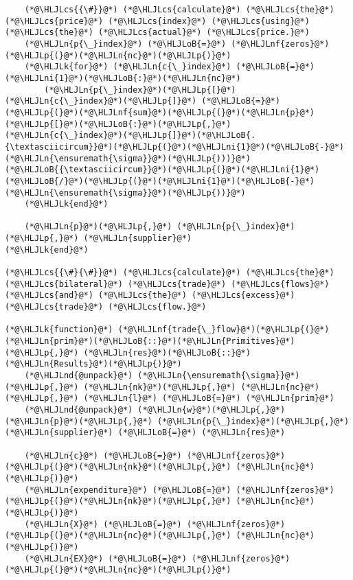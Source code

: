 \documentclass[12pt,a4paper]{article}
\newcommand{\HLJLk}[1]{\textcolor[RGB]{148,91,176}{\textbf{#1}}}
\newcommand{\HLJLn}[1]{#1}
\newcommand{\HLJLnd}[1]{\textcolor[RGB]{214,102,97}{#1}}
\newcommand{\HLJLnf}[1]{\textcolor[RGB]{66,102,213}{#1}}
\newcommand{\HLJLni}[1]{\textcolor[RGB]{59,151,46}{#1}}
\newcommand{\HLJLoB}[1]{\textcolor[RGB]{102,102,102}{\textbf{#1}}}
\newcommand{\HLJLp}[1]{#1}
\newcommand{\HLJLcs}[1]{\textcolor[RGB]{153,153,119}{\textit{#1}}}
\begin{document}
\begin{lstlisting}
    (*@\HLJLcs{{\#}}@*) (*@\HLJLcs{calculate}@*) (*@\HLJLcs{the}@*) (*@\HLJLcs{price}@*) (*@\HLJLcs{index}@*) (*@\HLJLcs{using}@*) (*@\HLJLcs{the}@*) (*@\HLJLcs{actual}@*) (*@\HLJLcs{price.}@*)
    (*@\HLJLn{p{\_}index}@*) (*@\HLJLoB{=}@*) (*@\HLJLnf{zeros}@*)(*@\HLJLp{(}@*)(*@\HLJLn{nc}@*)(*@\HLJLp{)}@*)
    (*@\HLJLk{for}@*) (*@\HLJLn{c{\_}index}@*) (*@\HLJLoB{=}@*) (*@\HLJLni{1}@*)(*@\HLJLoB{:}@*)(*@\HLJLn{nc}@*)
        (*@\HLJLn{p{\_}index}@*)(*@\HLJLp{[}@*)(*@\HLJLn{c{\_}index}@*)(*@\HLJLp{]}@*) (*@\HLJLoB{=}@*) (*@\HLJLp{(}@*)(*@\HLJLnf{sum}@*)(*@\HLJLp{(}@*)(*@\HLJLn{p}@*)(*@\HLJLp{[}@*)(*@\HLJLoB{:}@*)(*@\HLJLp{,}@*) (*@\HLJLn{c{\_}index}@*)(*@\HLJLp{]}@*)(*@\HLJLoB{.{\textasciicircum}}@*)(*@\HLJLp{(}@*)(*@\HLJLni{1}@*)(*@\HLJLoB{-}@*)(*@\HLJLn{\ensuremath{\sigma}}@*)(*@\HLJLp{)))}@*)(*@\HLJLoB{{\textasciicircum}}@*)(*@\HLJLp{(}@*)(*@\HLJLni{1}@*)(*@\HLJLoB{/}@*)(*@\HLJLp{(}@*)(*@\HLJLni{1}@*)(*@\HLJLoB{-}@*)(*@\HLJLn{\ensuremath{\sigma}}@*)(*@\HLJLp{))}@*)
    (*@\HLJLk{end}@*)

    (*@\HLJLn{p}@*)(*@\HLJLp{,}@*) (*@\HLJLn{p{\_}index}@*)(*@\HLJLp{,}@*) (*@\HLJLn{supplier}@*)
(*@\HLJLk{end}@*)

(*@\HLJLcs{{\#}{\#}}@*) (*@\HLJLcs{calculate}@*) (*@\HLJLcs{the}@*) (*@\HLJLcs{bilateral}@*) (*@\HLJLcs{trade}@*) (*@\HLJLcs{flows}@*) (*@\HLJLcs{and}@*) (*@\HLJLcs{the}@*) (*@\HLJLcs{excess}@*) (*@\HLJLcs{trade}@*) (*@\HLJLcs{flow.}@*)

(*@\HLJLk{function}@*) (*@\HLJLnf{trade{\_}flow}@*)(*@\HLJLp{(}@*)(*@\HLJLn{prim}@*)(*@\HLJLoB{::}@*)(*@\HLJLn{Primitives}@*)(*@\HLJLp{,}@*) (*@\HLJLn{res}@*)(*@\HLJLoB{::}@*)(*@\HLJLn{Results}@*)(*@\HLJLp{)}@*)
    (*@\HLJLnd{@unpack}@*) (*@\HLJLn{\ensuremath{\sigma}}@*)(*@\HLJLp{,}@*) (*@\HLJLn{nk}@*)(*@\HLJLp{,}@*) (*@\HLJLn{nc}@*)(*@\HLJLp{,}@*) (*@\HLJLn{l}@*) (*@\HLJLoB{=}@*) (*@\HLJLn{prim}@*)
    (*@\HLJLnd{@unpack}@*) (*@\HLJLn{w}@*)(*@\HLJLp{,}@*) (*@\HLJLn{p}@*)(*@\HLJLp{,}@*) (*@\HLJLn{p{\_}index}@*)(*@\HLJLp{,}@*) (*@\HLJLn{supplier}@*) (*@\HLJLoB{=}@*) (*@\HLJLn{res}@*)

    (*@\HLJLn{c}@*) (*@\HLJLoB{=}@*) (*@\HLJLnf{zeros}@*)(*@\HLJLp{(}@*)(*@\HLJLn{nk}@*)(*@\HLJLp{,}@*) (*@\HLJLn{nc}@*)(*@\HLJLp{)}@*)
    (*@\HLJLn{expenditure}@*) (*@\HLJLoB{=}@*) (*@\HLJLnf{zeros}@*)(*@\HLJLp{(}@*)(*@\HLJLn{nk}@*)(*@\HLJLp{,}@*) (*@\HLJLn{nc}@*)(*@\HLJLp{)}@*)
    (*@\HLJLn{X}@*) (*@\HLJLoB{=}@*) (*@\HLJLnf{zeros}@*)(*@\HLJLp{(}@*)(*@\HLJLn{nc}@*)(*@\HLJLp{,}@*) (*@\HLJLn{nc}@*)(*@\HLJLp{)}@*)
    (*@\HLJLn{EX}@*) (*@\HLJLoB{=}@*) (*@\HLJLnf{zeros}@*)(*@\HLJLp{(}@*)(*@\HLJLn{nc}@*)(*@\HLJLp{)}@*)


\end{lstlisting}
\end{document}
